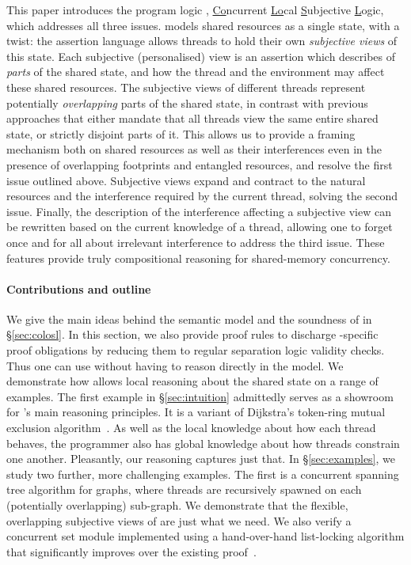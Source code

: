 This paper introduces the program logic \colosl,
\underline{Co}ncurrent \underline{Lo}cal \underline{S}ubjective
\underline{L}ogic, which addresses all three issues. \colosl models
shared resources as a single state, with a twist: the assertion
language allows threads to hold their own \emph{subjective views} of
this state. Each subjective (personalised) view is an assertion which
describes of \emph{parts} of the shared state, and how the thread and
the environment may affect these shared resources.  The subjective
views of different threads represent potentially \emph{overlapping}
parts of the shared state, in contrast with previous approaches that
either mandate that all threads view the same entire shared state, or
strictly disjoint parts of it. This allows us to provide a framing
mechanism both on shared resources as well as their interferences even
in the presence of overlapping footprints and entangled resources, and
resolve the first issue outlined above. Subjective views expand and
contract to the natural resources and the interference required by the
current thread, solving the second issue. Finally, the description of
the interference affecting a subjective view can be rewritten based on
the current knowledge of a thread, allowing one to forget once and for
all about irrelevant interference to address the third issue. These
features provide truly compositional reasoning for shared-memory
concurrency.

\paragraph{Contributions and outline} 
We give the main ideas behind the semantic model and the soundness of
\colosl in \S\ref{sec:colosl}. In this section, we also provide proof
rules to discharge \colosl-specific proof obligations by reducing them
to regular separation logic validity checks. Thus one can use \colosl
without having to reason directly in the model. We demonstrate how
\colosl allows local reasoning about the shared state on a range of
examples.  The first example in \S\ref{sec:intuition} admittedly
serves as a showroom for \colosl's main reasoning principles. It is a
variant of Dijkstra's token-ring mutual exclusion
algorithm~\cite{dijkstra74}. As well as the local knowledge about how
each thread behaves, the programmer also has global knowledge about
how threads constrain one another. Pleasantly, our reasoning captures
just that. In \S\ref{sec:examples}, we study two further, more
challenging examples. The first is a concurrent spanning tree
algorithm for graphs, where threads are recursively spawned on each
(potentially overlapping) sub-graph. We demonstrate that the flexible,
overlapping subjective views of \colosl are just what we need.  We
also verify a concurrent set module implemented using a hand-over-hand
list-locking algorithm that significantly improves over the existing
proof~\cite{cap-ecoop10}.
%

